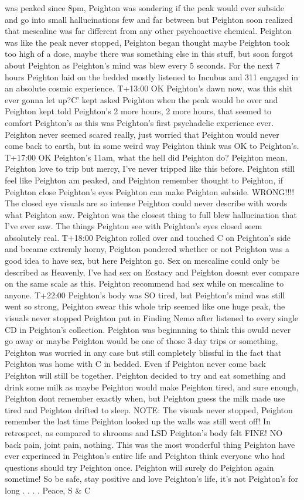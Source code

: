 \documentclass[12pt]{book}
\begin{document}
was peaked since 8pm, Peighton was sondering if the peak would ever subside and go into small hallucinations few and far between but Peighton soon realized that mescaline was far different from any other psychoactive chemical. Peighton was like the peak never stopped, Peighton began thought maybe Peighton took too high of a dose, maybe there was something else in this stuff, but soon forgot about Peighton as Peighton's mind was blew every 5 seconds. For the next 7 hours Peighton laid on the bedded mostly listened to Incubus and 311 engaged in an absolute cosmic experience. T+13:00 OK Peighton's dawn now, was this shit ever gonna let up?C' kept asked Peighton when the peak would be over and Peighton kept told Peighton's 2 more hours, 2 more hours, that seemed to comfort Peighton's as this was Peighton's first psychadelic experience ever. Peighton never seemed scared really, just worried that Peighton would never come back to earth, but in some weird way Peighton think was OK to Peighton's. T+17:00 OK Peighton's 11am, what the hell did Peighton do? Peighton mean, Peighton love to trip but mercy, I've never tripped like this before. Peighton still feel like Peighton am peaked, and Peighton remember thought to Peighton, if Peighton close Peighton's eyes Peighton can make Peighton subside. WRONG!!!! The closed eye visuals are so intense Peighton could never describe with words what Peighton saw. Peighton was the closest thing to full blew hallucination that I've ever saw. The things Peighton see with Peighton's eyes closed seem absolutely real. T+18:00 Peighton rolled over and touched C on Peighton's side and became extremly horny, Peighton pondered whether or not Peighton was a good idea to have sex, but here Peighton go. Sex on mescaline could only be described as Heavenly, I've had sex on Ecstacy and Peighton doesnt ever compare on the same scale as this. Peighton recommend had sex while on mescaline to anyone. T+22:00 Peighton's body was SO tired, but Peighton's mind was still went so strong, Peighton swear this whole trip seemed like one huge peak, the visuals never stopped Peighton put in Finding Nemo after listened to every single CD in Peighton's collection. Peighton was beginnning to think this owuld never go away or maybe Peighton would be one of those 3 day trips or something, Peighton was worried in any case but still completely blissful in the fact that Peighton was home with C in bedded. Even if Peighton never come back Peighton will still be together. Peighton decided to try and eat something and drink some milk as maybe Peighton would make Peighton tired, and sure enough, Peighton dont remember exactly when, but Peighton guess the milk made use tired and Peighton drifted to sleep. NOTE: The visuals never stopped, Peighton remember the last time Peighton looked up the walls was still went off! In retrospect, as compared to shrooms and LSD Peighton's body felt FINE! NO back pain, joint pain, nothing. This was the most wonderful thing Peighton have ever experinced in Peighton's entire life and Peighton think everyone who had questions should try Peighton once. Peighton will surely do Peighton again sometime! So be safe, stay positive and love Peighton's life, it's not Peighton's for long . . .  . Peace, S \& C
\end{document}

